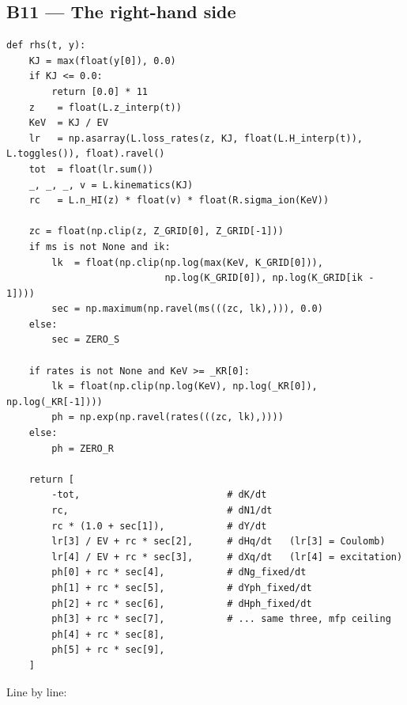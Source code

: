 \documentclass[11pt,a4paper]{article}
\begin{document}
\subsection*{B11 --- The right-hand side}

\begin{lstlisting}
def rhs(t, y):
    KJ = max(float(y[0]), 0.0)
    if KJ <= 0.0:
        return [0.0] * 11
    z    = float(L.z_interp(t))
    KeV  = KJ / EV
    lr   = np.asarray(L.loss_rates(z, KJ, float(L.H_interp(t)), L.toggles()), float).ravel()
    tot  = float(lr.sum())
    _, _, _, v = L.kinematics(KJ)
    rc   = L.n_HI(z) * float(v) * float(R.sigma_ion(KeV))

    zc = float(np.clip(z, Z_GRID[0], Z_GRID[-1]))
    if ms is not None and ik:
        lk  = float(np.clip(np.log(max(KeV, K_GRID[0])),
                            np.log(K_GRID[0]), np.log(K_GRID[ik - 1])))
        sec = np.maximum(np.ravel(ms(((zc, lk),))), 0.0)
    else:
        sec = ZERO_S

    if rates is not None and KeV >= _KR[0]:
        lk = float(np.clip(np.log(KeV), np.log(_KR[0]), np.log(_KR[-1])))
        ph = np.exp(np.ravel(rates(((zc, lk),))))
    else:
        ph = ZERO_R

    return [
        -tot,                          # dK/dt
        rc,                            # dN1/dt
        rc * (1.0 + sec[1]),           # dY/dt
        lr[3] / EV + rc * sec[2],      # dHq/dt   (lr[3] = Coulomb)
        lr[4] / EV + rc * sec[3],      # dXq/dt   (lr[4] = excitation)
        ph[0] + rc * sec[4],           # dNg_fixed/dt
        ph[1] + rc * sec[5],           # dYph_fixed/dt
        ph[2] + rc * sec[6],           # dHph_fixed/dt
        ph[3] + rc * sec[7],           # ... same three, mfp ceiling
        ph[4] + rc * sec[8],
        ph[5] + rc * sec[9],
    ]
\end{lstlisting}

Line by line:
\end{document}
